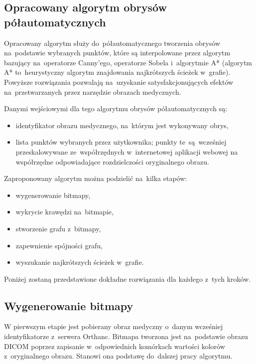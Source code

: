 \documentclass[a4paper,11pt,twoside,openright]{report}
\theoremstyle{definition}
\begin{document}
\subsection {Opracowany algorytm obrysów półautomatycznych}

Opracowany algorytm służy do~półautomatycznego tworzenia obrysów na~podstawie wybranych punktów,
które są interpolowane przez algorytm bazujący na~operatorze Canny'ego, operatorze
Sobela i~algorytmie A* (algorytm A* to~heurystyczny algorytm znajdowania najkrótszych ścieżek w~grafie).
Powyższe rozwiązania pozwalają na~uzyskanie satysfakcjonujących efektów na~przetwarzanych
przez narzędzie obrazach medycznych.

Danymi wejściowymi dla tego algorytmu obrysów półautomatycznych są:
\begin{itemize}[noitemsep]
\item {identyfikator obrazu medycznego, na~którym jest wykonywany obrys,}
\item {lista punktów wybranych przez użytkownika; punkty te~są~wcześniej
przeskalowywane ze~współrzędnych w~internetowej aplikacji webowej
na współrzędne odpowiadające rozdzielczości oryginalnego obrazu.}
\end{itemize}


Zaproponowany algorytm można podzielić na~kilka etapów:

\begin{itemize}[noitemsep]
\item {wygenerowanie bitmapy,}
\item {wykrycie krawędzi na~bitmapie,}
\item {stworzenie grafu z~bitmapy,}
\item {zapewnienie spójności grafu,}
\item {wyszukanie najkrótszych ścieżek w~grafie.}
\end{itemize}

Poniżej zostaną przedstawione dokładne rozwiązania dla każdego z~tych kroków.

\subsection {Wygenerowanie bitmapy}

W pierwszym etapie jest pobierany obraz medyczny o~danym wcześniej
identyfikatorze z~serwera Orthanc. Bitmapa tworzona jest na~podstawie obrazu DICOM poprzez
zapisanie w~odpowiednich komórkach wartości kolorów z~oryginalnego obrazu.
Stanowi ona podstawę do~dalszej pracy algorytmu.
\end{document}
